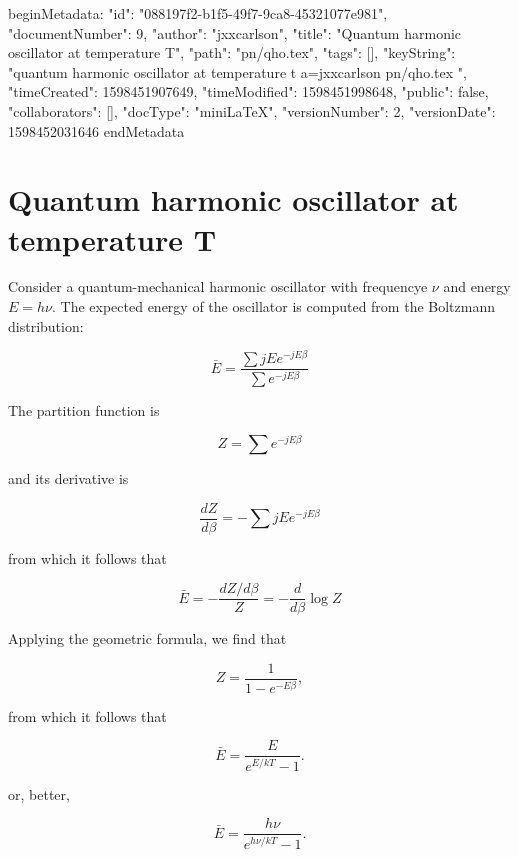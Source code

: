 beginMetadata:
{
    "id": "088197f2-b1f5-49f7-9ca8-45321077e981",
    "documentNumber": 9,
    "author": "jxxcarlson",
    "title": "Quantum harmonic oscillator at temperature T",
    "path": "pn/qho.tex",
    "tags": [],
    "keyString": "quantum harmonic oscillator at temperature t a=jxxcarlson pn/qho.tex ",
    "timeCreated": 1598451907649,
    "timeModified": 1598451998648,
    "public": false,
    "collaborators": [],
    "docType": "miniLaTeX",
    "versionNumber": 2,
    "versionDate": 1598452031646
}
endMetadata

\section{Quantum harmonic oscillator at temperature T}

Consider a quantum-mechanical harmonic oscillator with frequencye $\nu$ and energy $E = h\nu$.  The expected energy of the oscillator is computed from the Boltzmann distribution:

\begin{equation}
\bar{E} = \frac{\sum jE e^{-jE\beta}}{\sum e^{-jE\beta}}
\end{equation}

The partition function is

\begin{equation}
Z = \sum e^{-jE\beta}
\end{equation}

and its derivative is


\begin{equation}
\frac{dZ}{d\beta} =  - \sum jE e^{-jE\beta}
\end{equation}

from which it follows that

\begin{equation}
\bar{E} = - \frac{dZ/d\beta}{Z} = - \frac{d}{d\beta} \log Z
\end{equation}

Applying the geometric formula, we find that

\begin{equation}
Z = \frac{1}{1 - e^{-E\beta}},
\end{equation}

from which it follows that

\begin{equation}
\bar{E} = \frac{E}{e^{E/kT} - 1}.
\end{equation}


or, better,


\begin{equation}
\bar{E} = \frac{h\nu}{e^{h\nu/kT} - 1}.
\end{equation}
